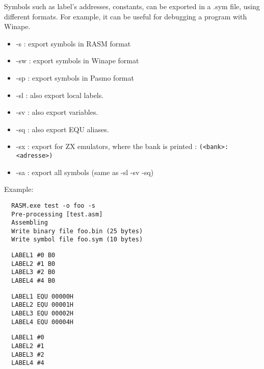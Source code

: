 \begin{xen}
Symbols such as label's addresses, constants, can be exported in a .sym file, using different formats.
For example, it can be useful for debugging a program with Winape.
  \begin{itemize}
    \item -s : export symbols in RASM format
    \item -sw :	export symbols in Winape format
    \item -sp :	export symbols in Pasmo format
    \item -sl :	also export local labels.
    \item -sv :	also export variables.
    \item -sq :	also export EQU aliases.
    \item -sx : export for ZX emulators, where the bank is printed :  \texttt{(<bank>:<adresse>)}
    \item -sa :	export all symbols (same as -sl -sv -sq)
  \end{itemize}
  Example:
\end{xen}

\begin{verbatim}
  RASM.exe test -o foo -s
  Pre-processing [test.asm]
  Assembling
  Write binary file foo.bin (25 bytes)
  Write symbol file foo.sym (10 bytes)
\end{verbatim}


\begin{verbatim}
  LABEL1 #0 B0
  LABEL2 #1 B0
  LABEL3 #2 B0
  LABEL4 #4 B0
\end{verbatim}


\begin{verbatim}
  LABEL1 EQU 00000H
  LABEL2 EQU 00001H
  LABEL3 EQU 00002H
  LABEL4 EQU 00004H
\end{verbatim}


\begin{verbatim}
  LABEL1 #0
  LABEL2 #1
  LABEL3 #2
  LABEL4 #4
\end{verbatim}


